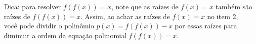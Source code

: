 \documentclass[a4paper,fleqn,12pt]{article}
\begin{document}
Dica: para resolver $f(f(x)) = x$, note que as raízes de $f(x) = x$ também são raízes de $f(f(x)) = x$. Assim, ao achar as raízes de $f(x) = x$ no item 2, você pode dividir o polinômio $p(x) = f(f(x)) - x$ por essas raízes para diminuir a ordem da equação polinomial $f(f(x)) = x$.


\pagebreak




\pagebreak
\end{document}

